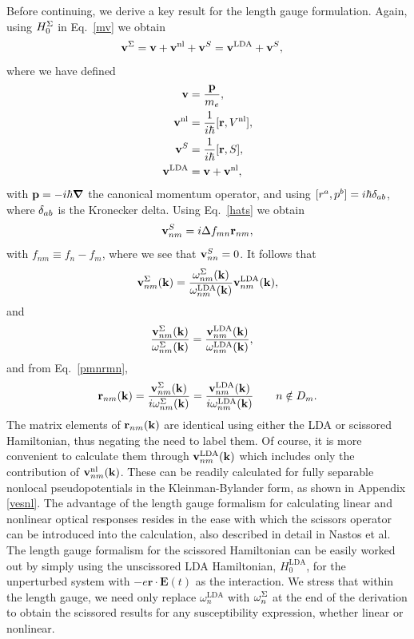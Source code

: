 \documentclass[floatfix,prb,aps,superscriptaddress,showpacs,11pt,preprint,letterpaper]{revtex4}
\begin{document}
Before continuing,
we derive a key result for the length gauge formulation. 
Again, using $H^\Sigma_0$ in
Eq.~\eqref{mv} we obtain
\begin{align}\label{vop2}
\mathbf{v}^\Sigma&=
\mathbf{v} 
+
\mathbf{v}^{\mathrm{nl}} 
+\mathbf{v}^S
=
\mathbf{v}^{\mathrm{LDA}} 
+\mathbf{v}^S 
,
\end{align}
where we have defined 
\begin{subequations}
\begin{align}\label{ve}
\mathbf{v} 
&=\frac{\mathbf{p}}{m_e},
\\\label{vnl}
\mathbf{v}^{\mathrm{nl}} 
&=
\frac{1}{i\hbar}[\mathbf{r},V^{\mathrm{nl}}],
\\\label{vs}
\mathbf{v}^S
&=
\frac{1}{i\hbar}[\mathbf{r}, S],
\\\label{vlda}
\mathbf{v}^{\mathrm{LDA}} 
&=
\mathbf{v} 
+\mathbf{v}^{\mathrm{nl}}
,
\end{align}  
\end{subequations}
with $\mathbf{p}=-i\hbar\boldsymbol{\nabla}$ the canonical momentum operator, 
and using $[r^a,p^b]=i\hbar\delta_{ab}$, where $\delta_{ab}$ is the Kronecker delta.
Using Eq.~\eqref{hats} we obtain 
\begin{equation}\label{chon.2} 
\mathbf{v}^S_{nm}=i\Delta f_{mn}\mathbf{r}_{nm},
\end{equation}
with $f_{nm}\equiv f_n-f_m$,
where we see that $\mathbf{v}^S_{nn}=0$. It follows that
\begin{align}\label{chon.9}
\mathbf{v}^\Sigma_{nm}(\mathbf{k}) 
=\frac{\omega^\Sigma_{nm}(\mathbf{k})}{\omega^{\mathrm{LDA}}_{nm}(\mathbf{k})}
\mathbf{v}^{\mathrm{LDA}}_{nm}(\mathbf{k}) 
,
\end{align}
and
 \begin{align}\label{chon.8}
\frac{\mathbf{v}^\Sigma_{nm}(\mathbf{k})}{\omega^\Sigma_{nm}(\mathbf{k})}
&=
\frac{\mathbf{v}^{\mathrm{LDA}}_{nm}(\mathbf{k})}{\omega^{\mathrm{LDA}}_{nm}(\mathbf{k})}
,
\end{align}
and from Eq.~\eqref{pmnrmn},
\begin{align}\label{chon.10}
\mathbf{r}_{nm}(\mathbf{k}) 
=
\frac{\mathbf{v}^\Sigma_{nm}(\mathbf{k})}{i\omega^\Sigma_{nm}(\mathbf{k})}
=
\frac{\mathbf{v}^{\mathrm{LDA}}_{nm}(\mathbf{k})}{i\omega^{\mathrm{LDA}}_{nm}(\mathbf{k})}
\quad\quad n\notin D_m 
. 
\end{align}
The matrix elements 
of $\mathbf{r}_{nm}(\mathbf{k})$ are identical using either
the LDA or scissored
Hamiltonian, thus negating the need to label them.
Of course, it is more convenient to calculate them
through $\mathbf{v}^{\mathrm{LDA}}_{nm}(\mathbf{k})$ which 
includes only the contribution of 
$\mathbf{v}^{\mathrm{nl}}_{nm}(\mathbf{k})$. These can be readily
calculated
for 
fully separable nonlocal pseudopotentials in the 
Kleinman-Bylander 
form,\cite{francesco,mottaCMS10,kleinmanPRL82,adolphPRB96}
as shown in Appendix \ref{vesnl}.
The advantage of the length gauge formalism for 
calculating linear and nonlinear optical responses 
resides in the ease with which the scissors operator
can be introduced into the calculation, also described in detail in
Nastos et al.\cite{nastosPRB05} The 
length gauge formalism for the scissored Hamiltonian can be easily worked 
out by simply using the unscissored LDA Hamiltonian,
$H_0^{\mathrm{LDA}}$,
for the unperturbed system 
with $-e\mathbf{r}\cdot \mathbf{E}(t)$ as the interaction. 
We stress that within the length gauge,
we need only replace $\omega^{\mathrm{LDA}}_{n}$ with 
$\omega_{n}^{\Sigma}$ at the end of the derivation
to obtain the scissored results for any 
susceptibility expression, whether linear or nonlinear. 
\end{document}
